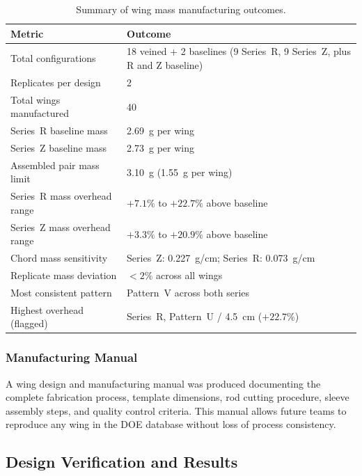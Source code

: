 \begin{table}[H]
    \centering
    \begin{tabular}{||p{5.5cm}|p{7cm}||}
        \hline
        \textbf{Metric} & \textbf{Outcome} \\
        \hline\hline
        Total configurations & 18 veined + 2 baselines (9 Series~R, 9 Series~Z, plus R and Z baseline) \\
        \hline
        Replicates per design & 2 \\
        \hline
        Total wings manufactured & 40 \\
        \hline
        Series~R baseline mass & 2.69~g per wing \\
        \hline
        Series~Z baseline mass & 2.73~g per wing \\
        \hline
        Assembled pair mass limit & 3.10~g (1.55~g per wing) \\
        \hline
        Series~R mass overhead range & $+7.1\%$ to $+22.7\%$ above 
        baseline \\
        \hline
        Series~Z mass overhead range & $+3.3\%$ to $+20.9\%$ above 
        baseline \\
        \hline
        Chord mass sensitivity & Series~Z: 0.227~g/cm; Series~R: 0.073~g/cm \\
        \hline
        Replicate mass deviation & $<2\%$ across all wings \\
        \hline
        Most consistent pattern & Pattern~V across both series \\
        \hline
        Highest overhead (flagged) & Series~R, Pattern~U / 4.5~cm 
        ($+22.7\%$) \\
        \hline
    \end{tabular}
    \caption{Summary of wing mass manufacturing outcomes.}
    \label{tab:mfg_outcomes}
\end{table}

\subsubsection{Manufacturing Manual}A wing design and manufacturing manual was produced documenting the complete fabrication process,  template dimensions, rod cutting procedure, sleeve assembly steps, and quality control criteria. This manual allows future teams to reproduce any wing in the DOE database without loss of process consistency.

\subsection{Design Verification and Results}

